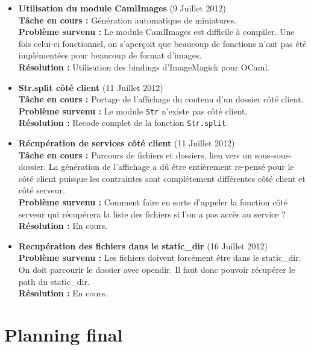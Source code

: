 \documentclass{life-fr}
\begin{document}
\begin{itemize}
  \item \textbf{Utilisation du module CamlImages} (9 Juillet 2012)\\
    \textbf{Tâche en cours :} Génération automatique de miniatures.\\
    \textbf{Problème survenu :} Le module CamlImages est difficile à compiler. Une fois celui-ci fonctionnel, on s'aperçoit que beaucoup de fonctions n'ont pas été implémentées pour beaucoup de format d'images.\\
    \textbf{Résolution :} Utilisation des bindings d'ImageMagick pour OCaml.

  \item \textbf{Str.split côté client} (11 Juillet 2012)\\
    \textbf{Tâche en cours :} Portage de l'affichage du contenu d'un dossier côté client.\\
    \textbf{Problème survenu :} Le module \texttt{Str} n'existe pas côté client.\\
    \textbf{Résolution :} Recode complet de la fonction \texttt{Str.split}.

  \item \textbf{Récupération de services côté client} (11 Juillet 2012)\\
    \textbf{Tâche en cours :} Parcours de fichiers et dossiers, lien vers un sous-sous-dossier. La génération de l'affichage a dû être entièrement re-pensé pour le côté client puisque les contraintes sont complétement différentes côté client et côté serveur.\\
    \textbf{Problème survenu :} Comment faire en sorte d'appeler la fonction côté serveur qui récupérera la liste des fichiers si l'on a pas accès au service ? \\
    \textbf{Résolution :} En cours.

  \item \textbf{Recupération des fichiers dans le static\_dir} (16 Juillet 2012)\\
    \textbf{Problème survenu :} Les fichiers doivent forcément être dans le static\_dir. On doit parcourir le dossier avec opendir. Il faut donc pouvoir récupérer le path du static\_dir. \\
    \textbf{Résolution :} En cours.

\end{itemize}

\section{Planning final}
\end{document}
